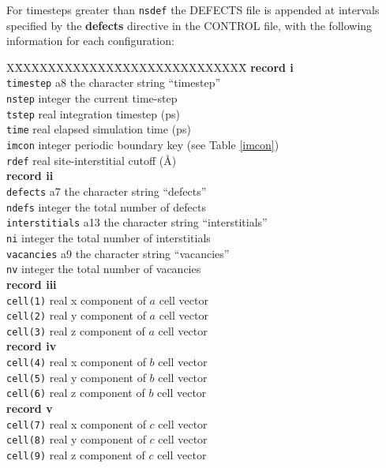 For timesteps greater than {\tt nsdef} the DEFECTS file is
appended at intervals specified by the {\bf defects} directive in the
CONTROL file, with the following information for each
configuration:
\begin{tabbing}
X\=XXXXXXXXXXXX\=XXXXXXXXXXXXXXXX\=\kill
{\bf record i} \\
\> {\tt timestep}      \> a8      \> the character string ``timestep'' \\
\> {\tt nstep}         \> integer \> the current time-step \\
\> {\tt tstep}         \> real    \> integration timestep (ps) \\
\> {\tt time}          \> real    \> elapsed simulation time (ps) \\
\> {\tt imcon}         \> integer \> periodic boundary key (see Table \ref{imcon}) \\
\> {\tt rdef}          \> real    \> site-interstitial cutoff (\AA) \\
{\bf record ii} \\
\> {\tt defects}       \> a7      \> the character string ``defects'' \\
\> {\tt ndefs}         \> integer \> the total number of defects \\
\> {\tt interstitials} \> a13     \> the character string ``interstitials'' \\
\> {\tt ni}            \> integer \> the total number of interstitials \\
\> {\tt vacancies}     \> a9      \> the character string ``vacancies'' \\
\> {\tt nv}            \> integer \> the total number of vacancies \\
{\bf record iii} \\
\> {\tt cell(1)}       \> real    \> x component of $a$ cell vector \\
\> {\tt cell(2)}       \> real    \> y component of $a$ cell vector \\
\> {\tt cell(3)}       \> real    \> z component of $a$ cell vector \\
{\bf record iv} \\
\> {\tt cell(4)}       \> real    \> x component of $b$ cell vector \\
\> {\tt cell(5)}       \> real    \> y component of $b$ cell vector \\
\> {\tt cell(6)}       \> real    \> z component of $b$ cell vector \\
{\bf record v} \\
\> {\tt cell(7)}       \> real    \> x component of $c$ cell vector \\
\> {\tt cell(8)}       \> real    \> y component of $c$ cell vector \\
\> {\tt cell(9)}       \> real    \> z component of $c$ cell vector \\
\end{tabbing}
